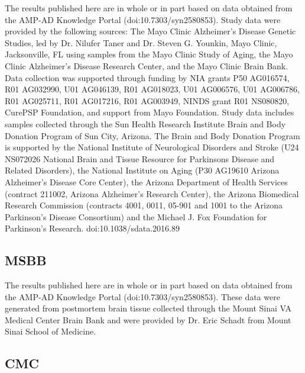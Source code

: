 The results published here are in whole or in part based on data obtained from the AMP-AD Knowledge Portal (doi:10.7303/syn2580853). Study data were provided by the following sources: The Mayo Clinic Alzheimer’s Disease Genetic Studies, led by Dr. Nilufer Taner and Dr. Steven G. Younkin, Mayo Clinic, Jacksonville, FL using samples from the Mayo Clinic Study of Aging, the Mayo Clinic Alzheimer’s Disease Research Center, and the Mayo Clinic Brain Bank. Data collection was supported through funding by NIA grants P50 AG016574, R01 AG032990, U01 AG046139, R01 AG018023, U01 AG006576, U01 AG006786, R01 AG025711, R01 AG017216, R01 AG003949, NINDS grant R01 NS080820, CurePSP Foundation, and support from Mayo Foundation. Study data includes samples collected through the Sun Health Research Institute Brain and Body Donation Program of Sun City, Arizona. The Brain and Body Donation Program is supported by the National Institute of Neurological Disorders and Stroke (U24 NS072026 National Brain and Tissue Resource for Parkinsons Disease and Related Disorders), the National Institute on Aging (P30 AG19610 Arizona Alzheimer’s Disease Core Center), the Arizona Department of Health Services (contract 211002, Arizona Alzheimer’s Research Center), the Arizona Biomedical Research Commission (contracts 4001, 0011, 05-901 and 1001 to the Arizona Parkinson's Disease Consortium) and the Michael J. Fox Foundation for Parkinson’s Research.  doi:10.1038/sdata.2016.89 


\subsection*{MSBB}
The results published here are in whole or in part based on data obtained from the AMP-AD Knowledge Portal (doi:10.7303/syn2580853). These data were generated from postmortem brain tissue collected through the Mount Sinai VA Medical Center Brain Bank and were provided by Dr. Eric Schadt from Mount Sinai School of Medicine. 

\subsection*{CMC}

